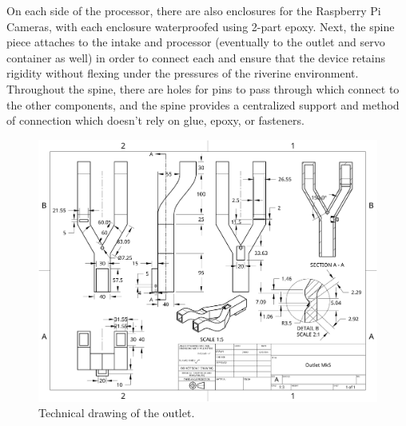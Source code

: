 \documentclass[fleqn,10pt]{SelfArx} %
\begin{document}
	On each side of the processor, there are also enclosures for the Raspberry Pi Cameras, with each enclosure waterproofed using 2-part epoxy. 
	\linebreak
	Next, the spine piece attaches to the intake and processor (eventually to the outlet and servo container as well) in order to connect each and ensure that the device retains rigidity without flexing under the pressures of the riverine environment. Throughout the spine, there are holes for pins to pass through which connect to the other components, and the spine provides a centralized support and method of connection which doesn’t rely on glue, epoxy, or fasteners. 
	\begin{figure}[h]
		\centering
		\includegraphics[width=1\linewidth]{Figures/TechOutlet}
		\caption[Outlet Tech. Drawing]{Technical drawing of the outlet.}
		\label{fig:techOutlet}
	\end{figure}
	
\end{document}
